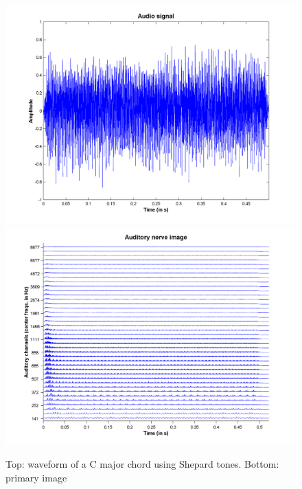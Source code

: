 \begin{figure}[h]
    \centering
    \includegraphics[width=\IPEMDefaultFigureWidth]{Graphics/ShepardCChordAudioSignal}
    \includegraphics[width=\IPEMDefaultFigureWidth]{Graphics/ShepardCChordANI}
    \caption{Top: waveform of a C major chord using Shepard tones. Bottom: primary image}
    \label{Fig:ShepardCChordANIandAudioSignal}
\end{figure}
